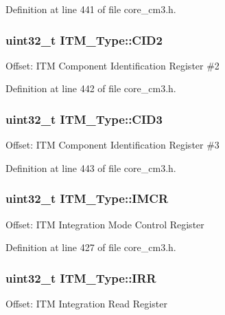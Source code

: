 Definition at line 441 of file core\+\_\+cm3.\+h.

\subsubsection[{\texorpdfstring{C\+I\+D2}{CID2}}]{ {\bf uint32\+\_\+t} I\+T\+M\+\_\+\+Type\+::\+C\+I\+D2}\hypertarget{struct_i_t_m___type_adee4ccce1429db8b5db3809c4539f876}{}\label{struct_i_t_m___type_adee4ccce1429db8b5db3809c4539f876}
Offset\+: I\+TM Component Identification Register \#2 

Definition at line 442 of file core\+\_\+cm3.\+h.

\subsubsection[{\texorpdfstring{C\+I\+D3}{CID3}}]{ {\bf uint32\+\_\+t} I\+T\+M\+\_\+\+Type\+::\+C\+I\+D3}\hypertarget{struct_i_t_m___type_a0e7aa199619cc7ac6baddff9600aa52e}{}\label{struct_i_t_m___type_a0e7aa199619cc7ac6baddff9600aa52e}
Offset\+: I\+TM Component Identification Register \#3 

Definition at line 443 of file core\+\_\+cm3.\+h.

\subsubsection[{\texorpdfstring{I\+M\+CR}{IMCR}}]{ {\bf uint32\+\_\+t} I\+T\+M\+\_\+\+Type\+::\+I\+M\+CR}\hypertarget{struct_i_t_m___type_ab2e87d8bb0e3ce9b8e0e4a6a6695228a}{}\label{struct_i_t_m___type_ab2e87d8bb0e3ce9b8e0e4a6a6695228a}
Offset\+: I\+TM Integration Mode Control Register 

Definition at line 427 of file core\+\_\+cm3.\+h.

\subsubsection[{\texorpdfstring{I\+RR}{IRR}}]{ {\bf uint32\+\_\+t} I\+T\+M\+\_\+\+Type\+::\+I\+RR}\hypertarget{struct_i_t_m___type_ae43a66174b8ab182ff595e5f5da9f235}{}\label{struct_i_t_m___type_ae43a66174b8ab182ff595e5f5da9f235}
Offset\+: I\+TM Integration Read Register 

